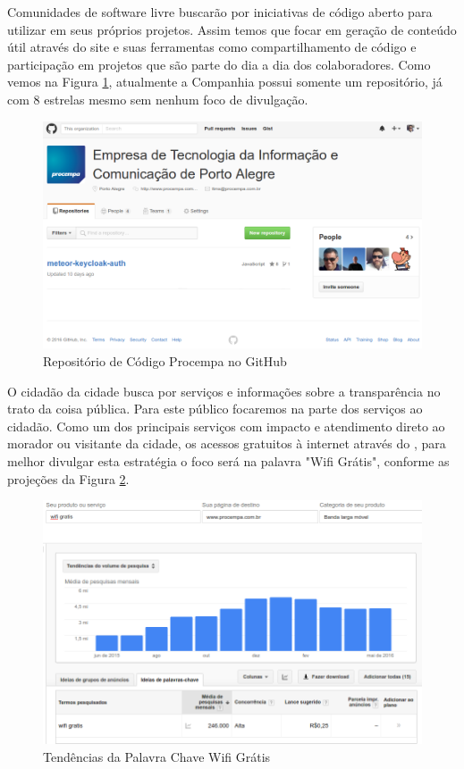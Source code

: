 Comunidades de software livre buscarão por iniciativas de código aberto para utilizar em seus próprios projetos. Assim temos que focar em geração de conteúdo útil através do site  e suas ferramentas como compartilhamento de código e participação em projetos que são parte do dia a dia dos colaboradores. Como vemos na Figura \ref{fig:github-procempa}, atualmente a Companhia possui somente um repositório, já com 8 estrelas mesmo sem nenhum foco de divulgação.

\begin{figure}[!h]
  \centering
    \includegraphics[width=.8\textwidth]{github-procempa}
  \caption{Repositório de Código Procempa no GitHub}
  \label{fig:github-procempa}
\end{figure}

O cidadão da cidade busca por serviços e informações sobre a transparência no trato da coisa pública. Para este público focaremos na parte dos serviços ao cidadão. Como um dos principais serviços com impacto e atendimento direto ao morador ou visitante da cidade, os acessos gratuitos à internet através do , para melhor divulgar esta estratégia o foco será na palavra "Wifi Grátis", conforme as projeções da Figura \ref{fig:wifi-gratis}.

\begin{figure}[!h]
  \centering
    \includegraphics[width=.8\textwidth]{wifi-gratis}
  \caption{Tendências da Palavra Chave Wifi Grátis}
  \label{fig:wifi-gratis}
\end{figure}
